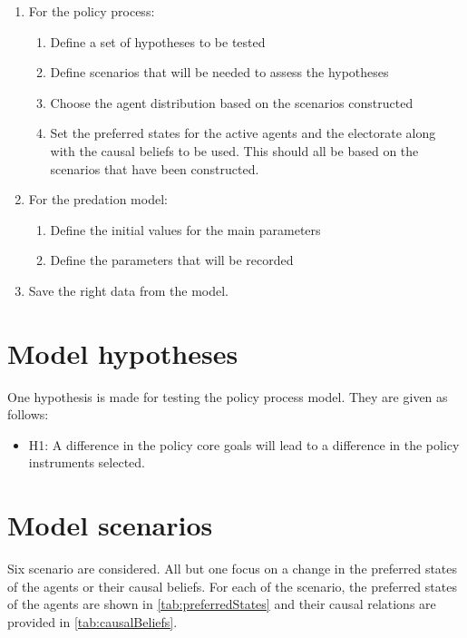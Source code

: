 \documentclass[12pt]{article}
\begin{document}
\begin{enumerate}
\item For the policy process:
	\begin{enumerate}
	\item Define a set of hypotheses to be tested
	\item Define scenarios that will be needed to assess the hypotheses
	\item Choose the agent distribution based on the scenarios constructed
	\item Set the preferred states for the active agents and the electorate along with the causal beliefs to be used. This should all be based on the scenarios that have been constructed.
	\end{enumerate}

\item For the predation model:
	\begin{enumerate}
	\item Define the initial values for the main parameters
	\item Define the parameters that will be recorded
	\end{enumerate}
\item Save the right data from the model.
\end{enumerate}

\section{Model hypotheses}
\label{sec:steps}

One hypothesis is made for testing the policy process model. They are given as follows:

\begin{itemize}
\item H1: A difference in the policy core goals will lead to a difference in the policy instruments selected.
\end{itemize}

\section{Model scenarios}
\label{sec:steps}

Six scenario are considered. All but one focus on a change in the preferred states of the agents or their causal beliefs. For each of the scenario, the preferred states of the agents are shown in \autoref{tab:preferredStates} and their causal relations are provided in \autoref{tab:causalBeliefs}.
\end{document}
